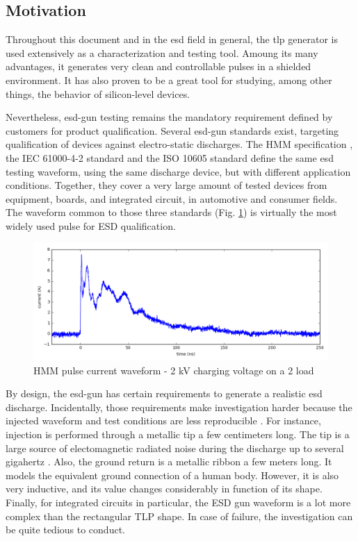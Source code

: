 \subsection{Motivation}

Throughout this document and in the \gls{esd} field in general, the \gls{tlp} generator is used extensively as a characterization and testing tool.
Amoung its many advantages, it generates very clean and controllable pulses in a shielded environment.
It has also proven to be a great tool for studying, among other things, the behavior of silicon-level devices.

Nevertheless, \gls{esd-gun} testing remains the mandatory requirement defined by customers for product qualification.
Several \gls{esd-gun} standards exist, targeting qualification of devices against electro-static discharges.
The HMM specification \cite{hmm}, the IEC 61000-4-2 standard \cite{iec61000-4-2} and the ISO 10605 standard \cite{iso10605} define the same \gls{esd} testing waveform, using the same discharge device, but with different application conditions.
Together, they cover a very large amount of tested devices from equipment, boards, and integrated circuit, in automotive and consumer fields.
The waveform common to those three standards (Fig. \ref{fig:hmm-waveform}) is virtually the most widely used pulse for ESD qualification.

\begin{figure}[!h]
  \centering
  \includegraphics[width=\textwidth]{src/5/figures/hmm_pulse.png}
  \caption{HMM pulse current waveform - 2 kV charging voltage on a 2\textOmega{} load}
  \label{fig:hmm-waveform}
\end{figure}

By design, the \gls{esd-gun} has certain requirements to generate a realistic \gls{esd} discharge.
Incidentally, those requirements make investigation harder because the injected waveform and test conditions are less reproducible \cite{hmm-round-robin-study}.
For instance, injection is performed through a metallic tip a few centimeters long.
The tip is a large source of electomagnetic radiated noise during the discharge up to several gigahertz \cite{system-level-esd-failure-variation}.
Also, the ground return is a metallic ribbon a few meters long.
It models the equivalent ground connection of a human body.
However, it is also very inductive, and its value changes considerably in function of its shape.
Finally, for integrated circuits in particular, the ESD gun waveform is a lot more complex than the rectangular TLP shape.
In case of failure, the investigation can be quite tedious to conduct.

